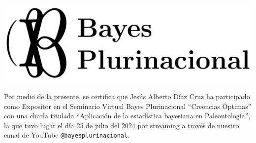 \documentclass[a4paper,11pt]{letter}
\begin{document}
\begin{landscape} \centering
\includegraphics[width=14cm]{BP.pdf}

\vspace{1.75cm}


\vspace{1cm}


\LARGE

Por medio de la presente, se certifica que Jesús Alberto Díaz Cruz ha participado como Expositor en el Seminario Virtual Bayes Plurinacional ``Creencias Óptimas'' con una charla titulada ``Aplicación de la estadística bayesiana en Paleontología'', la que tuvo lugar el día 25 de julio del 2024 por streaming a través de nuestro canal de YouTube \texttt{@bayesplurinacional}.


\end{landscape}
\end{document}
